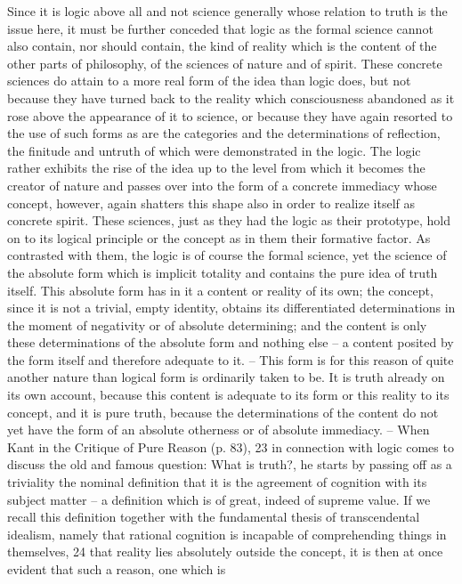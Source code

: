 Since it is logic above all and not science generally whose relation to
truth is the issue here, it must be further conceded that logic as the formal
science cannot also contain, nor should contain, the kind of reality which
is the content of the other parts of philosophy, of the sciences of nature
and of spirit. These concrete sciences do attain to a more real form of the
idea than logic does, but not because they have turned back to the reality
which consciousness abandoned as it rose above the appearance of it to
science, or because they have again resorted to the use of such forms as
are the categories and the determinations of reflection, the finitude and
untruth of which were demonstrated in the logic. The logic rather exhibits
the rise of the idea up to the level from which it becomes the creator
of nature and passes over into the form of a concrete immediacy whose
concept, however, again shatters this shape also in order to realize itself as
concrete spirit. These sciences, just as they had the logic as their prototype,
hold on to its logical principle or the concept as in them their formative
factor. As contrasted with them, the logic is of course the formal science,
yet the science of the absolute form which is implicit totality and contains
the pure idea of truth itself. This absolute form has in it a content or reality
of its own; the concept, since it is not a trivial, empty identity, obtains its
differentiated determinations in the moment of negativity or of absolute
determining; and the content is only these determinations of the absolute
form and nothing else – a content posited by the form itself and therefore
adequate to it. – This form is for this reason of quite another nature than
logical form is ordinarily taken to be. It is truth already on its own account,
because this content is adequate to its form or this reality to its concept,
and it is pure truth, because the determinations of the content do not yet
have the form of an absolute otherness or of absolute immediacy. – When
Kant in the Critique of Pure Reason (p. 83), 23 in connection with logic
comes to discuss the old and famous question: What is truth?, he starts by
passing off as a triviality the nominal definition that it is the agreement of
cognition with its subject matter – a definition which is of great, indeed of
supreme value. If we recall this definition together with the fundamental
thesis of transcendental idealism, namely that rational cognition is incapable
of comprehending things in themselves, 24 that reality lies absolutely outside
the concept, it is then at once evident that such a reason, one which is
